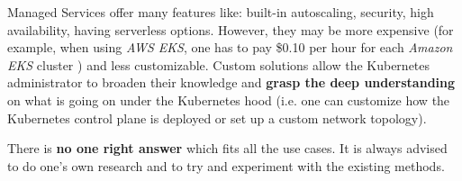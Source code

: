 Managed Services offer many features like: built-in autoscaling, security, high availability, having serverless options. However, they may be more expensive (for example, when using \textit{AWS EKS}, one has to pay \$0.10 per hour for each \textit{Amazon EKS} cluster \cite{online-eks-pricing}) and less customizable. Custom solutions allow the Kubernetes administrator to broaden their knowledge and \textbf{grasp the deep understanding} on what is going on under the Kubernetes hood (i.e. one can customize how the Kubernetes control plane is deployed or set up a custom network topology).

There is \textbf{no one right answer} which fits all the use cases. It is always advised to do one's own research and to try and experiment with the existing methods.
